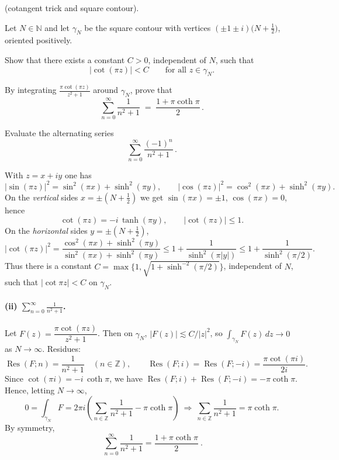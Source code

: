 \begin{problem}[CP-IV-0137]
\label{prob:cp-iv-0137}
(cotangent trick and square contour).

Let $N\in\mathbb N$ and let $\gamma_N$ be the square contour with vertices
$(\pm1\pm i)\bigl(N+\tfrac12\bigr)$, oriented positively.

	\par\noindent\textbullet\quad Show that there exists a constant $C>0$, independent of $N$, such that
	\[
	|\cot(\pi z)|<C \qquad \text{for all } z\in\gamma_N .
	\]
	\par\noindent\textbullet\quad By integrating $\displaystyle \frac{\pi\cot(\pi z)}{z^{2}+1}$ around $\gamma_N$,
	prove that
	\[
	\sum_{n=0}^{\infty}\frac{1}{n^{2}+1}\;=\;\frac{1+\pi\coth\pi}{2}\, .
	\]
	\par\noindent\textbullet\quad Evaluate the alternating series
	\[
	\sum_{n=0}^{\infty}\frac{(-1)^{n}}{n^{2}+1}\, .
	\]

With $z=x+iy$ one has
\[
|\sin(\pi z)|^{2}=\sin^{2}(\pi x)+\sinh^{2}(\pi y),\qquad
|\cos(\pi z)|^{2}=\cos^{2}(\pi x)+\sinh^{2}(\pi y).
\]
On the \emph{vertical} sides $x=\pm(N+\tfrac12)$ we get
$\sin(\pi x)=\pm1$, $\cos(\pi x)=0$, hence
\[
\cot(\pi z)=-i\,\tanh(\pi y),\qquad |\cot(\pi z)|\le 1.
\]
On the \emph{horizontal} sides $y=\pm(N+\tfrac12)$,
\[
|\cot(\pi z)|^{2}
=\frac{\cos^{2}(\pi x)+\sinh^{2}(\pi y)}{\sin^{2}(\pi x)+\sinh^{2}(\pi y)}
\le 1+\frac{1}{\sinh^{2}(\pi|y|)}
\le 1+\frac{1}{\sinh^{2}(\pi/2)}.
\]
Thus there is a constant
$C=\max\!\big\{1,\sqrt{1+\sinh^{-2}(\pi/2)}\big\}$, independent of $N$, such that
$|\cot \pi z|<C$ on $\gamma_N$.

\medskip
\paragraph{(ii) $\displaystyle \sum_{n=0}^{\infty}\frac{1}{n^{2}+1}$.}
Let $F(z)=\dfrac{\pi\cot(\pi z)}{z^{2}+1}$. Then on $\gamma_N$,
$|F(z)|\lesssim C/|z|^{2}$, so $\int_{\gamma_N}F(z)\,dz\to0$ as $N\to\infty$.
Residues:
\[
\operatorname{Res}(F;n)=\frac{1}{n^{2}+1}\quad(n\in\mathbb Z),
\qquad
\operatorname{Res}(F;i)=\operatorname{Res}(F;-i)=\frac{\pi\cot(\pi i)}{2i}.
\]
Since $\cot(\pi i)=-i\,\coth\pi$, we have
$\operatorname{Res}(F;i)+\operatorname{Res}(F;-i)=-\pi\coth\pi$.
Hence, letting $N\to\infty$,
\[
0=\int_{\gamma_N}F
=2\pi i\!\left(\sum_{n\in\mathbb Z}\frac{1}{n^{2}+1}-\pi\coth\pi\right)
\ \Rightarrow\
\sum_{n\in\mathbb Z}\frac{1}{n^{2}+1}=\pi\coth\pi.
\]
By symmetry,
\[
\boxed{\ \sum_{n=0}^{\infty}\frac{1}{n^{2}+1}=\frac{1+\pi\coth\pi}{2}\ }.
\]


\end{problem}
